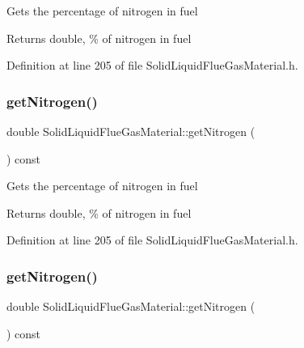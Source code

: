 Gets the percentage of nitrogen in fuel \begin{DoxyReturn}{Returns}
double, \% of nitrogen in fuel 
\end{DoxyReturn}


Definition at line 205 of file Solid\+Liquid\+Flue\+Gas\+Material.\+h.

\mbox{\label{class_solid_liquid_flue_gas_material_a76159a5d9d609f0e0131f7bca3b60ebc}} 
\subsubsection{\texorpdfstring{get\+Nitrogen()}{getNitrogen()}\hspace{0.1cm}{\footnotesize\ttfamily [2/3]}}
{\footnotesize\ttfamily double Solid\+Liquid\+Flue\+Gas\+Material\+::get\+Nitrogen (\begin{DoxyParamCaption}{ }\end{DoxyParamCaption}) const\hspace{0.3cm}{\ttfamily [inline]}}

Gets the percentage of nitrogen in fuel \begin{DoxyReturn}{Returns}
double, \% of nitrogen in fuel 
\end{DoxyReturn}


Definition at line 205 of file Solid\+Liquid\+Flue\+Gas\+Material.\+h.

\mbox{\label{class_solid_liquid_flue_gas_material_a76159a5d9d609f0e0131f7bca3b60ebc}} 
\subsubsection{\texorpdfstring{get\+Nitrogen()}{getNitrogen()}\hspace{0.1cm}{\footnotesize\ttfamily [3/3]}}
{\footnotesize\ttfamily double Solid\+Liquid\+Flue\+Gas\+Material\+::get\+Nitrogen (\begin{DoxyParamCaption}{ }\end{DoxyParamCaption}) const\hspace{0.3cm}{\ttfamily [inline]}}

